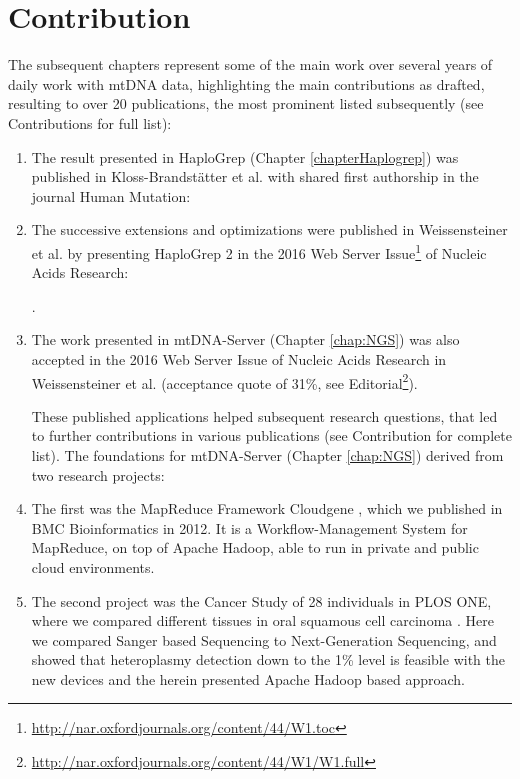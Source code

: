 \section{Contribution}


The subsequent chapters represent some of the main work over several years of daily work with mtDNA data, highlighting the main contributions as drafted, resulting to over 20 publications, the most prominent listed subsequently (see Contributions for full list):

\begin{enumerate}
\item 
The result presented in HaploGrep (Chapter \ref{chapterHaplogrep}) was published in Kloss-Brandst\"atter et al. with shared first authorship in the journal Human Mutation:

\item 
The successive extensions and optimizations were published in Weissensteiner et al. by presenting HaploGrep 2 in the 2016 Web Server Issue\footnote{\url{http://nar.oxfordjournals.org/content/44/W1.toc}} of Nucleic Acids Research:

.
\item 
The work presented in mtDNA-Server (Chapter \ref{chap:NGS}) was also accepted in the 2016 Web Server Issue of Nucleic Acids Research in Weissensteiner et al. (acceptance quote of 31\%, see Editorial\footnote{\url{http://nar.oxfordjournals.org/content/44/W1/W1.full}}).


These published applications helped subsequent research questions, that led to further contributions in various publications (see Contribution for complete list). 
The foundations for mtDNA-Server (Chapter \ref{chap:NGS}) derived from two research projects: 
\item The first was the MapReduce Framework Cloudgene \cite{Schonherr2012}, which we published in BMC Bioinformatics in 2012. It is a Workflow-Management System for MapReduce, on top of Apache Hadoop, able to run in private and public cloud environments.
\item The second project was the Cancer Study of 28 individuals in PLOS ONE, where we compared different tissues in oral squamous cell carcinoma \cite{Kloss-Brandstatter2015}. Here we compared Sanger based Sequencing to Next-Generation Sequencing, and showed that heteroplasmy detection down to the 1\% level is feasible with the new devices and the herein presented Apache Hadoop based approach. 


\end{enumerate}
